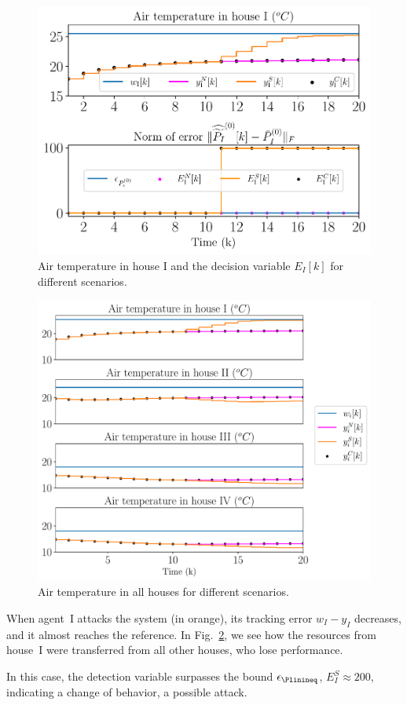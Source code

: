 \documentclass[../main.tex]{subfiles}
\begin{document}
\begin{figure}[h]
  \centering
 \includegraphics[width=.7\textwidth,trim=0 .3cm 0 .2cm,clip]{../img/resilient_ineq/ErrorWX_command_normErrH.pdf}
  \caption{Air temperature in house I and the decision variable $E_{I}[k]$ for different scenarios.}\label{fig:response3Scenarios}
\end{figure}
\begin{figure}[h]
  \centering
 \includegraphics[width=.7\textwidth,trim=0 .3cm 0 .2cm,clip]{../img/resilient_ineq/ErrorWX_command_normErrH_all_houses.pdf}
  \caption{Air temperature in all houses for different scenarios.}\label{fig:response3Scenarios_all_houses}
\end{figure}

When agent~I attacks the system (in orange), its tracking error
${w_{I}-y_{I}}$ decreases, and it almost reaches the reference.
In Fig.~\ref{fig:response3Scenarios_all_houses}, we see how the resources from house~I were transferred from all other houses, who lose performance.

In this case, the detection variable surpasses the bound $\epsilon_{\Plinineq}$,
${E_{I}^{S}\approx200}$, indicating a change of behavior, a possible attack.
\end{document}
